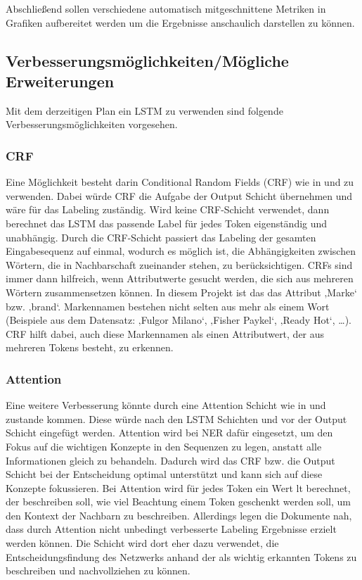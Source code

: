 \documentclass[paper=a4,12pt,listof=totoc]{scrartcl}%
\begin{document}
	Abschließend sollen verschiedene automatisch mitgeschnittene Metriken in Grafiken aufbereitet werden um die Ergebnisse anschaulich darstellen zu können.
		
	\subsection{Verbesserungsmöglichkeiten/Mögliche Erweiterungen} %
	Mit dem derzeitigen Plan ein LSTM zu verwenden sind folgende Verbesserungs\-möglichkeiten vorgesehen.
	
	\subsubsection{CRF}
	Eine Möglichkeit besteht darin Conditional Random Fields (CRF) wie in \cite{Majumder.2018} und \cite{Zheng.2018} zu verwenden. Dabei würde CRF die Aufgabe der Output Schicht übernehmen und wäre für das Labeling zuständig. Wird keine CRF-Schicht verwendet, dann berechnet das LSTM das passende Label für jedes Token eigenständig und unabhängig. Durch die CRF-Schicht passiert das Labeling der gesamten Eingabesequenz auf einmal, wodurch es möglich ist, die Abhängigkeiten zwischen Wörtern, die in Nachbarschaft zueinander stehen, zu berücksichtigen. CRFs sind immer dann hilfreich, wenn Attributwerte gesucht werden, die sich aus mehreren Wörtern zusammensetzen können. In diesem Projekt ist das das Attribut ‚Marke‘ bzw. ‚brand‘. Markennamen bestehen nicht selten aus mehr als einem Wort (Beispiele aus dem Datensatz: ‚Fulgor Milano‘, ‚Fisher Paykel‘, ‚Ready Hot‘, …). CRF hilft dabei, auch diese Markennamen als einen Attributwert, der aus mehreren Tokens besteht, zu erkennen. 
	
	\subsubsection{Attention}
	Eine weitere Verbesserung könnte durch eine Attention Schicht wie in \cite{Majumder.2018} und \cite{Zheng.2018} zustande kommen. Diese würde nach den LSTM Schichten und vor der Output Schicht eingefügt werden. Attention wird bei NER dafür eingesetzt, um den Fokus auf die wichtigen Konzepte in den Sequenzen zu legen, anstatt alle Informationen gleich zu behandeln. Dadurch wird das CRF bzw. die Output Schicht bei der Entscheidung optimal unterstützt und kann sich auf diese Konzepte fokussieren. Bei Attention wird für jedes Token ein Wert lt berechnet, der beschreiben soll, wie viel Beachtung einem Token geschenkt werden soll, um den Kontext der Nachbarn zu beschreiben. 
	Allerdings legen die Dokumente nah, dass durch Attention nicht unbedingt verbesserte Labeling Ergebnisse erzielt werden können. Die Schicht wird dort eher dazu verwendet, die Entscheidungsfindung des Netzwerks anhand der als wichtig erkannten Tokens zu beschreiben und nachvollziehen zu können. 
	
	
	\printbibliography[title=Literaturverzeichnis]
\end{document}
